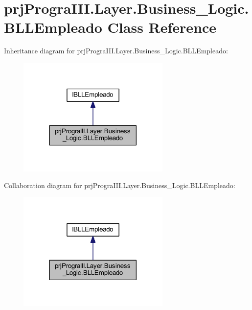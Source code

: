 \hypertarget{classprj_progra_i_i_i_1_1_layer_1_1_business___logic_1_1_b_l_l_empleado}{}\section{prj\+Progra\+I\+I\+I.\+Layer.\+Business\+\_\+\+Logic.\+B\+L\+L\+Empleado Class Reference}
\label{classprj_progra_i_i_i_1_1_layer_1_1_business___logic_1_1_b_l_l_empleado}


Inheritance diagram for prj\+Progra\+I\+I\+I.\+Layer.\+Business\+\_\+\+Logic.\+B\+L\+L\+Empleado\+:
\nopagebreak
\begin{figure}[H]
\begin{center}
\leavevmode
\includegraphics[width=213pt]{classprj_progra_i_i_i_1_1_layer_1_1_business___logic_1_1_b_l_l_empleado__inherit__graph}
\end{center}
\end{figure}


Collaboration diagram for prj\+Progra\+I\+I\+I.\+Layer.\+Business\+\_\+\+Logic.\+B\+L\+L\+Empleado\+:
\nopagebreak
\begin{figure}[H]
\begin{center}
\leavevmode
\includegraphics[width=213pt]{classprj_progra_i_i_i_1_1_layer_1_1_business___logic_1_1_b_l_l_empleado__coll__graph}
\end{center}
\end{figure}
